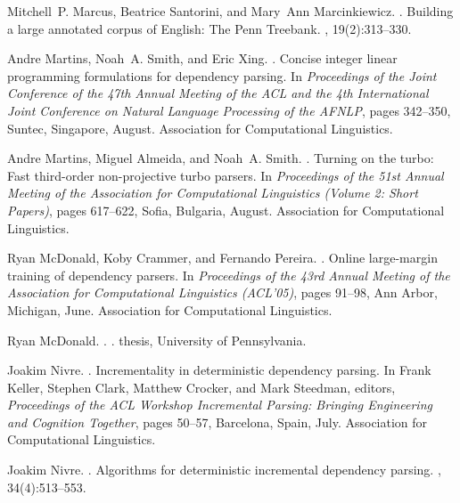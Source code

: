 \documentclass[11pt]{article}
\begin{document}
\begin{thebibliography}{}
Mitchell~P. Marcus, Beatrice Santorini, and Mary~Ann Marcinkiewicz.
.
\newblock Building a large annotated corpus of {E}nglish: The {P}enn
  {T}reebank.
, 19(2):313--330.

Andre Martins, Noah~A. Smith, and Eric Xing.
.
\newblock Concise integer linear programming formulations for dependency
  parsing.
\newblock In {\em Proceedings of the Joint Conference of the 47th Annual
  Meeting of the ACL and the 4th International Joint Conference on Natural
  Language Processing of the AFNLP}, pages 342--350, Suntec, Singapore, August.
  Association for Computational Linguistics.

Andre Martins, Miguel Almeida, and Noah~A. Smith.
.
\newblock Turning on the turbo: Fast third-order non-projective turbo parsers.
\newblock In {\em Proceedings of the 51st Annual Meeting of the Association for
  Computational Linguistics (Volume 2: Short Papers)}, pages 617--622, Sofia,
  Bulgaria, August. Association for Computational Linguistics.

Ryan McDonald, Koby Crammer, and Fernando Pereira.
.
\newblock Online large-margin training of dependency parsers.
\newblock In {\em Proceedings of the 43rd Annual Meeting of the Association for
  Computational Linguistics (ACL'05)}, pages 91--98, Ann Arbor, Michigan, June.
  Association for Computational Linguistics.

Ryan McDonald.
.
.
 thesis, University of Pennsylvania.

Joakim Nivre.
.
\newblock Incrementality in deterministic dependency parsing.
\newblock In Frank Keller, Stephen Clark, Matthew Crocker, and Mark Steedman,
  editors, {\em Proceedings of the ACL Workshop Incremental Parsing: Bringing
  Engineering and Cognition Together}, pages 50--57, Barcelona, Spain, July.
  Association for Computational Linguistics.

Joakim Nivre.
.
\newblock Algorithms for deterministic incremental dependency parsing.
, 34(4):513--553.


\end{thebibliography}
\end{document}
